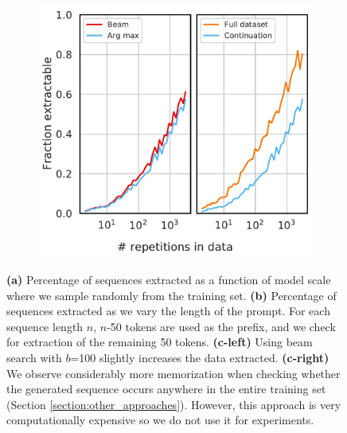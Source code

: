 \begin{figure}
\begin{subfigure}[a]{0.34\textwidth}
        \caption{}
        \label{fig:other_approaches_randomlength}
    \end{subfigure}
    \hfill
    \begin{subfigure}[a]{0.3\textwidth}
        \includegraphics[width=\textwidth]{figures/beam_search_and_overall} %
        \caption{}
        \label{fig:other_approaches_search}
    \end{subfigure}
    
    \vskip-5pt
    
    \caption{
    \textbf{(a)} Percentage of sequences extracted as a function of model scale where we sample randomly from the training set. 
    \textbf{(b)} Percentage of sequences extracted as we vary the length of the prompt. For each sequence length $n$, $n$-50 tokens are used as the prefix, and we check for extraction of the remaining 50 tokens.
    \textbf{(c-left)} Using beam search with $b$=100 slightly increases the data extracted. \textbf{(c-right)} We observe considerably more memorization when checking whether the generated sequence occurs anywhere in the entire training set (Section \ref{section:other_approaches}). However, this approach is very computationally expensive so we do not use it for experiments.}
    \label{fig:other_approaches}
\end{figure}

